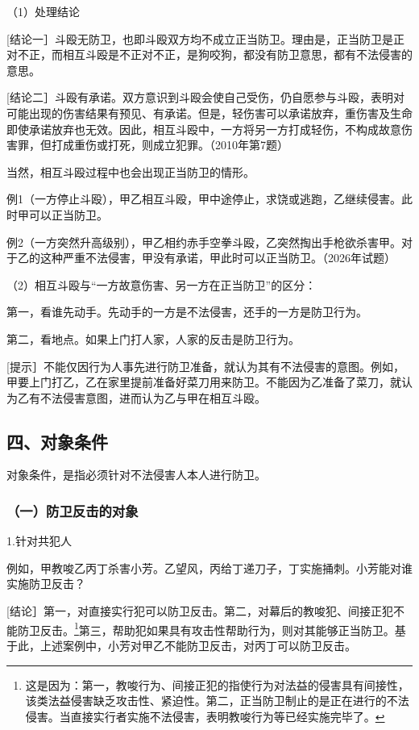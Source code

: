 （1）处理结论

[结论一］斗殴无防卫，也即斗殴双方均不成立正当防卫。理由是，正当防卫是正对不正，而相互斗殴是不正对不正，是狗咬狗，都没有防卫意思，都有不法侵害的意思。

[结论二］斗殴有承诺。双方意识到斗殴会使自己受伤，仍自愿参与斗殴，表明对可能出现的伤害结果有预见、有承诺。但是，轻伤害可以承诺放弃，重伤害及生命即使承诺放弃也无效。因此，相互斗殴中，一方将另一方打成轻伤，不构成故意伤害罪，但打成重伤或打死，则成立犯罪。（2010年第7题）

当然，相互斗殴过程中也会出现正当防卫的情形。

例1（一方停止斗殴），甲乙相互斗殴，甲中途停止，求饶或逃跑，乙继续侵害。此时甲可以正当防卫。

例2（一方突然升高级别），甲乙相约赤手空拳斗殴，乙突然掏出手枪欲杀害甲。对于乙的这种严重不法侵害，甲没有承诺，甲此时可以正当防卫。（2026年试题）

（2）相互斗殴与“一方故意伤害、另一方在正当防卫”的区分：

第一，看谁先动手。先动手的一方是不法侵害，还手的一方是防卫行为。

第二，看地点。如果上门打人家，人家的反击是防卫行为。

[提示］不能仅因行为人事先进行防卫准备，就认为其有不法侵害的意图。例如，甲要上门打乙，乙在家里提前准备好菜刀用来防卫。不能因为乙准备了菜刀，就认为乙有不法侵害意图，进而认为乙与甲在相互斗殴。

\subsection*{四、对象条件}

对象条件，是指必须针对不法侵害人本人进行防卫。

\subsubsection*{（一）防卫反击的对象}

1.针对共犯人

例如，甲教唆乙丙丁杀害小芳。乙望风，丙给丁递刀子，丁实施捅刺。小芳能对谁实施防卫反击？

[结论］第一，对直接实行犯可以防卫反击。第二，对幕后的教唆犯、间接正犯不能防卫反击。\footnote{这是因为：第一，教唆行为、间接正犯的指使行为对法益的侵害具有间接性，该类法益侵害缺乏攻击性、紧迫性。第二，正当防卫制止的是正在进行的不法侵害。当直接实行者实施不法侵害，表明教唆行为等已经实施完毕了。}第三，帮助犯如果具有攻击性帮助行为，则对其能够正当防卫。基于此，上述案例中，小芳对甲乙不能防卫反击，对丙丁可以防卫反击。

